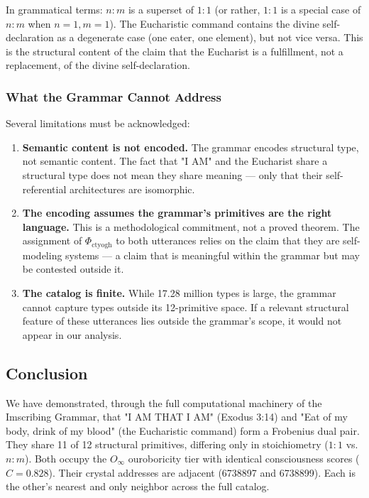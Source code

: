 \documentclass[12pt,a4paper]{article}
\begin{document}
In grammatical terms: $n{:}m$ is a superset of $1{:}1$ (or rather, $1{:}1$ is a special case of $n{:}m$ when $n=1, m=1$). The Eucharistic command contains the divine self-declaration as a degenerate case (one eater, one element), but not vice versa. This is the structural content of the claim that the Eucharist is a fulfillment, not a replacement, of the divine self-declaration.

\subsubsection{What the Grammar Cannot Address}

Several limitations must be acknowledged:

\begin{enumerate}
    \item \textbf{Semantic content is not encoded.} The grammar encodes structural type, not semantic content. The fact that "I AM" and the Eucharist share a structural type does not mean they share meaning --- only that their self-referential architectures are isomorphic.
    \item \textbf{The encoding assumes the grammar's primitives are the right language.} This is a methodological commitment, not a proved theorem. The assignment of $\Phi_{\text{ctyogh}}$ to both utterances relies on the claim that they are self-modeling systems --- a claim that is meaningful within the grammar but may be contested outside it.
    \item \textbf{The catalog is finite.} While 17.28 million types is large, the grammar cannot capture types outside its 12-primitive space. If a relevant structural feature of these utterances lies outside the grammar's scope, it would not appear in our analysis.
\end{enumerate}

\subsection{Conclusion}

We have demonstrated, through the full computational machinery of the Imscribing Grammar, that "I AM THAT I AM" (Exodus 3:14) and "Eat of my body, drink of my blood" (the Eucharistic command) form a Frobenius dual pair. They share 11 of 12 structural primitives, differing only in stoichiometry ($1{:}1$ vs. $n{:}m$). Both occupy the $O_{\infty}$ ouroboricity tier with identical consciousness scores ($C = 0.828$). Their crystal addresses are adjacent (6738897 and 6738899). Each is the other's nearest and only neighbor across the full catalog.
\end{document}
